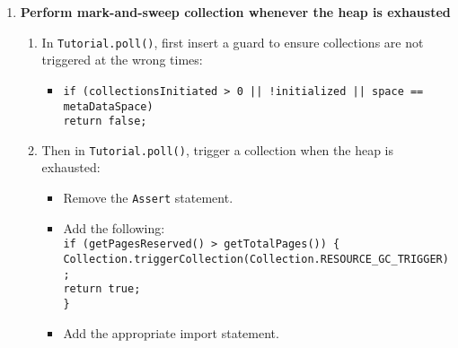 \documentclass{article}
\newcommand{\code}[1]{\texttt{#1}}
\begin{document}
\begin{itemize}
\begin{enumerate}
    \item \textbf{Perform mark-and-sweep collection whenever the heap is exhausted}
    \begin{enumerate}

        \item In \code{Tutorial.poll()}, first insert a guard to
        ensure collections are not triggered at the wrong times:
        \begin{itemize}
            \item \code{if (collectionsInitiated > 0 || !initialized || space ==
            metaDataSpace) \\ return false;}
        \end{itemize}

        \item Then in \code{Tutorial.poll()}, trigger a collection when the heap is exhausted:
        \begin{itemize}
            \item Remove the \code{Assert} statement.
            \item Add the following: \\
                \code{if (getPagesReserved() > getTotalPages()) \{ \\
                   Collection.triggerCollection(Collection.RESOURCE\_GC\_TRIGGER);
                   \\
                   return true; \\ \} }
            \item Add the appropriate import statement.
        \end{itemize}


\end{enumerate}
\end{enumerate}
\end{itemize}
\end{document}
